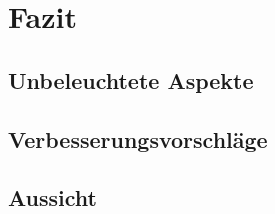 %
\chapter{Fazit}
\label{sec:conclusion}

\Blindtext[2][1]

\section{Unbeleuchtete Aspekte}
\label{sec:conclusion:sec1}

\Blindtext[2][2]

\section{Verbesserungsvorschläge}
\label{sec:conclusion:constructive}

\Blindtext[3][2]

\section{Aussicht}
\label{sec:conclusion:future}

\Blindtext[2][2]
